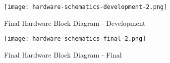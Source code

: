 

\begin{figure}
	\centering
	\texttt{[image: hardware-schematics-development-2.png]}
	\caption{Final Hardware Block Diagram - Development}
\end{figure}

\begin{figure}
	\centering
	\texttt{[image: hardware-schematics-final-2.png]}
	\caption{Final Hardware Block Diagram - Final}
\end{figure}